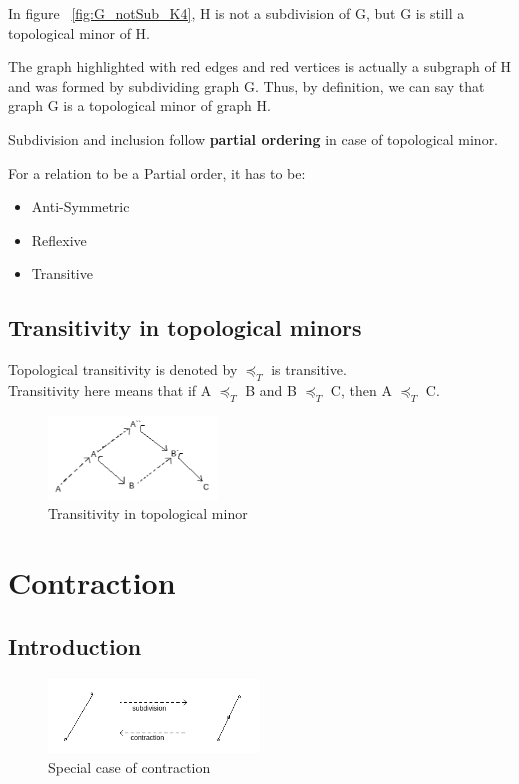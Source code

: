 \documentclass{article}
\begin{document}
In figure ~\ref{fig:G_notSub_K4}, H is not a subdivision of G, but G is still a topological minor of H. 

The graph highlighted with red edges and red vertices is actually a subgraph of H and was formed by subdividing graph G. Thus, by definition, we can say that graph G is a topological minor of graph H.

Subdivision and inclusion follow \textbf{partial ordering} in case of topological minor.

For a relation to be a Partial order, it has to be:
\begin{itemize}
    \item Anti-Symmetric
    \item Reflexive
    \item Transitive
\end{itemize}

\subsection{\textbf{Transitivity in topological minors}}
Topological transitivity is denoted by $\preceq _T$ is transitive.\\
Transitivity here means that if A $\preceq _T$ B and B $\preceq_T$ C, then A $\preceq _T$ C.

\begin{figure}[!h]
    \centering
    \includegraphics[width=0.4\textwidth]{images/top_transitivity.png}
    \caption{Transitivity in topological minor}
    \label{fig:}
\end{figure}


\section{Contraction}
\subsection{Introduction}
\begin{figure}[!h]
    \centering
    \includegraphics[width=0.5\textwidth]{images/contraction-1.png}
    \caption{Special case of contraction}
    \label{fig:contraction-1}
\end{figure}
\end{document}
